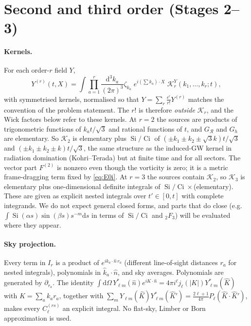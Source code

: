\documentclass[11pt]{article}
\theoremstyle{definition}
\theoremstyle{remark}
\newcommand{\eps}{\epsilon}
\newcommand{\nhat}{\hat n}
\newcommand{\dd}{\mathrm{d}}
\begin{document}
\section{Second and third order (Stages 2--3)}\label{sec:higher}

\paragraph{Kernels.} For each order-$r$ field $Y$,
\[
Y^{(r)}(t,X)=\int\prod_{a=1}^r\frac{\dd^3k_a}{(2\pi)^3}\zeta_{k_a}\;e^{i(\sum k_a)\cdot X}\;\mathcal K^Y_r(k_1,\dots,k_r;t),
\]
with symmetrised kernels, normalised so that
$Y=\sum_r\frac{\eps^r}{r!}Y^{(r)}$ matches the convention of the problem
statement. The $r!$ is therefore \emph{outside} $\mathcal K_r$, and the Wick
factors below refer to these kernels. At $r=2$ the sources are products of
trigonometric functions of $k_at/\sqrt3$ and rational functions of $t$, and
$G_{\mathcal R}$ and $G_h$ are elementary. So $\mathcal K_2$ is elementary
plus $\operatorname{Si}/\operatorname{Ci}$ of $(\pm k_1\pm k_2\pm\sqrt3k)t/\sqrt3$
and $(\pm k_1\pm k_2\pm k)t/\sqrt3$, the same structure as the induced-GW
kernel in radiation domination (Kohri--Terada) but at finite time and for
all sectors. The vector part $F^{(2)}$ is nonzero even though the vorticity
is zero; it is a metric frame-dragging term fixed by \eqref{eq:E0i}. At
$r=3$ the sources contain $\mathcal K_2$, so $\mathcal K_3$ is elementary
plus one-dimensional definite integrals of
$\operatorname{Si}/\operatorname{Ci}\times$(elementary). These are given as
explicit nested integrals over $t'\in[0,t]$ with complete integrands. We do
not expect general closed forms, and parts that do close (e.g.\
$\int\operatorname{Si}(\alpha s)\sin(\beta s)s^{-m}\dd s$ in terms of
$\operatorname{Si}/\operatorname{Ci}$ and ${}_2F_3$) will be evaluated where
they appear.

\paragraph{Sky projection.} Every term in $I_r$ is a product of
$e^{ik_a\cdot\nhat\,r_a}$ (different line-of-sight distances $r_a$ for
nested integrals), polynomials in $\hat k_a\cdot\nhat$, and sky averages.
Polynomials are generated by $\partial_{r_a}$. The identity
$\int\dd\Omega\,Y^*_{\ell m}(\nhat)e^{iK\cdot\nhat}=4\pi i^\ell
j_\ell(|K|)Y^*_{\ell m}(\hat K)$ with $K=\sum_ak_ar_a$, together with
$\sum_mY_{\ell m}(\hat K)Y^*_{\ell m}(\hat K')=\frac{2\ell+1}{4\pi}P_\ell(\hat
K\cdot\hat K')$, makes every $C^{(rs)}_\ell$ an explicit integral. No
flat-sky, Limber or Born approximation is used.
\end{document}
